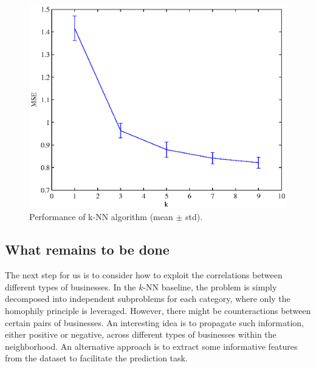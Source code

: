 \begin{figure}[t]
\centering
    \begin{minipage}[l]{\columnwidth}
      \centering
      \includegraphics[width=1\textwidth]{knn}
    \end{minipage}
  \caption{Performance of k-NN algorithm (mean $\pm$ std).}\label{knn}
\end{figure}

\subsection{What remains to be done}

The next step for us is to consider how to exploit the correlations between different types of businesses. In the $k$-NN baseline, the problem is simply decomposed into independent subproblems for each category, where only the homophily principle is leveraged. However, there might be counteractions between certain pairs of businesses. An interesting idea is to propagate such information, either positive or negative, across different types of businesses within the neighborhood. An alternative approach is to extract some informative features from the dataset to facilitate the prediction task.
